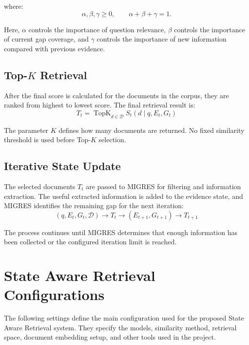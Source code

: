 \documentclass[12pt,a4paper]{report}
\begin{document}
where:
\[
\boxed{
\alpha,\beta,\gamma\geq0,
\qquad
\alpha+\beta+\gamma=1.
}
\tag{8}
\]

Here, $\alpha$ controls the importance of question relevance, $\beta$ controls the importance of current gap coverage, and $\gamma$ controls the importance of new information compared with previous evidence.

\subsection{Top-$K$ Retrieval}

After the final score is calculated for the documents in the corpus, they are ranked from highest to lowest score. The final retrieval result is:
\[
\boxed{
T_t=\operatorname{TopK}_{d\in\mathcal{D}} S_t(d\mid q,E_t,G_t)
}
\tag{9}
\]

The parameter $K$ defines how many documents are returned. No fixed similarity threshold is used before Top-$K$ selection.

\subsection{Iterative State Update}

The selected documents $T_t$ are passed to MIGRES for filtering and information extraction. The useful extracted information is added to the evidence state, and MIGRES identifies the remaining gap for the next iteration:
\[
\boxed{
(q,E_t,G_t,\mathcal{D})
\rightarrow
T_t
\rightarrow
(E_{t+1},G_{t+1})
\rightarrow
T_{t+1}
}
\tag{10}
\]

The process continues until MIGRES determines that enough information has been collected or the configured iteration limit is reached.
\clearpage

\section{State Aware Retrieval Configurations}

The following settings define the main configuration used for the proposed State Aware Retrieval system. They specify the models, similarity method, retrieval space, document embedding setup, and other tools used in the project.
\end{document}
